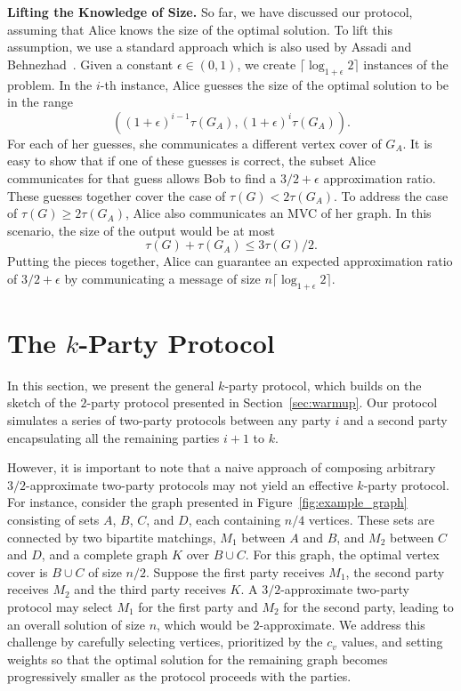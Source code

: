 \documentclass[11pt]{article}
\newcommand{\mvc}[1]{\tau\left(#1 \right)}
\begin{document}
\noindent\textbf{Lifting the Knowledge of Size.}
So far, we have discussed our protocol, assuming that Alice knows the
size of the optimal solution. To lift this assumption, we use a
standard approach which is also used by Assadi and Behnezhad~\cite{DBLP:conf/approx/AssadiB21}. Given a constant \(
\epsilon \in (0,1) \), we create \( \lceil \log_{1+\epsilon}2
\rceil\) instances of the problem. In the \( i \)-th instance, Alice
guesses the size of the optimal solution to be in the range
\[ ((1+\epsilon)^{i-1} \mvc{G_A}, (1+\epsilon)^i \mvc{G_A}). \]
For each of her guesses, she communicates a different vertex cover of
\( G_A \). It is easy to show that if one of these guesses is correct,
the subset Alice communicates for that guess allows Bob to find a
\(3/2+\epsilon\) approximation ratio. These guesses together cover the
case of \( \mvc{G} < 2\mvc{G_A} \). To address the case of \( \mvc{G}
\geq 2\mvc{G_A} \), Alice also communicates an MVC of her graph. In
this scenario, the size of the output would be at most
\[ \mvc{G} + \mvc{G_A} \leq  3\mvc{G}/2. \]
Putting the pieces together, Alice can guarantee an expected approximation ratio of \(3/2+\epsilon\) by communicating a message of size \( n \lceil \log_{1+\epsilon}2\rceil \).




 \section{The $k$-Party Protocol}
\label{sec:k-party} 
In this section, we present the general $k$-party protocol, which
builds on the sketch of the $2$-party protocol presented in
Section~\ref{sec:warmup}. Our protocol simulates a series of two-party protocols between any party $i$ and a second party encapsulating all the remaining parties $i+1$ to $k$. 


However, it is important to note that a naive approach of composing arbitrary
$3/2$-approximate two-party protocols may not yield an effective $k$-party protocol.  For instance, consider the graph presented in Figure~\ref{fig:example_graph} consisting of sets $A$, $B$, $C$, and $D$, each containing $n/4$ vertices. These sets are connected by two bipartite matchings, $M_1$ between $A$ and $B$, and $M_2$ between $C$ and $D$, and a complete graph $K$ over $B \cup C$.  For this graph, the optimal vertex cover is $B \cup C$ of size $n/2$.  Suppose the first party receives $M_1$, the second party receives $M_2$ and the third party receives $K$.  A $3/2$-approximate two-party protocol may select $M_1$ for the first party and $M_2$ for the second party, leading to an overall solution of size $n$, which would be $2$-approximate.  We address this challenge by carefully selecting vertices, prioritized by the $c_v$ values, and setting weights so that the optimal solution for the remaining graph becomes progressively smaller as the protocol proceeds with the parties.  
\end{document}

